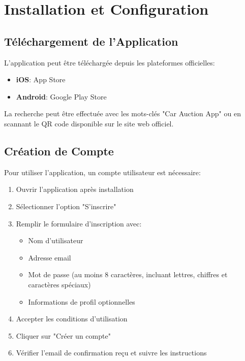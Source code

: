 \section{Installation et Configuration}

\subsection{Téléchargement de l'Application}

L'application peut être téléchargée depuis les plateformes officielles:

\begin{itemize}
    \item \textbf{iOS}: App Store
    \item \textbf{Android}: Google Play Store
\end{itemize}

La recherche peut être effectuée avec les mots-clés "Car Auction App" ou en scannant le QR code disponible sur le site web officiel.

\subsection{Création de Compte}

Pour utiliser l'application, un compte utilisateur est nécessaire:

\begin{enumerate}
    \item Ouvrir l'application après installation
    \item Sélectionner l'option "S'inscrire"
    \item Remplir le formulaire d'inscription avec:
    \begin{itemize}
        \item Nom d'utilisateur
        \item Adresse email
        \item Mot de passe (au moins 8 caractères, incluant lettres, chiffres et caractères spéciaux)
        \item Informations de profil optionnelles
    \end{itemize}
    \item Accepter les conditions d'utilisation
    \item Cliquer sur "Créer un compte"
    \item Vérifier l'email de confirmation reçu et suivre les instructions
\end{enumerate}

